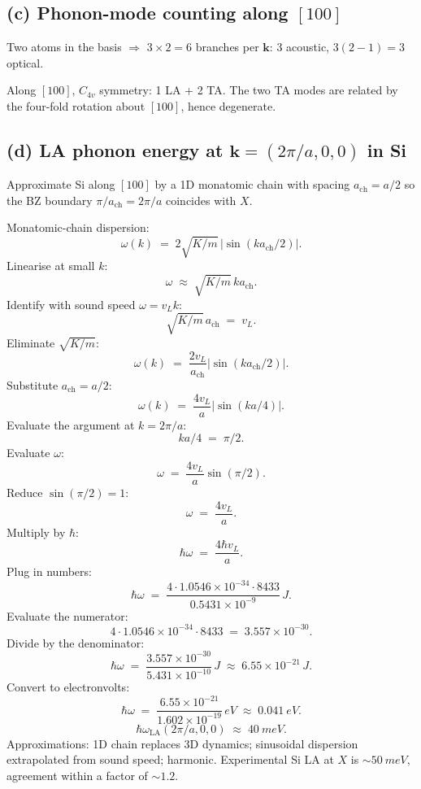 \documentclass[11pt]{article}
\begin{document}
\subsection*{(c) Phonon-mode counting along $[100]$}

Two atoms in the basis $\Rightarrow$ $3\times 2=6$ branches per $\bm k$: 3 acoustic, $3(2-1)=3$ optical.

Along $[100]$, $C_{4v}$ symmetry: 1 LA + 2 TA. The two TA modes are related by the four-fold rotation about $[100]$, hence degenerate.

\subsection*{(d) LA phonon energy at $\bm k=(2\pi/a,0,0)$ in Si}

Approximate Si along $[100]$ by a 1D monatomic chain with spacing $a_{\text{ch}}=a/2$ so the BZ boundary $\pi/a_{\text{ch}}=2\pi/a$ coincides with $X$.

Monatomic-chain dispersion:
\[
\omega(k) \;=\; 2\sqrt{K/m}\,\big|\sin(k a_{\text{ch}}/2)\big|.
\]
Linearise at small $k$:
\[
\omega \;\approx\; \sqrt{K/m}\,k a_{\text{ch}}.
\]
Identify with sound speed $\omega=v_L k$:
\[
\sqrt{K/m}\,a_{\text{ch}} \;=\; v_L.
\]
Eliminate $\sqrt{K/m}$:
\[
\omega(k) \;=\; \frac{2 v_L}{a_{\text{ch}}}\big|\sin(k a_{\text{ch}}/2)\big|.
\]
Substitute $a_{\text{ch}}=a/2$:
\[
\omega(k) \;=\; \frac{4 v_L}{a}\big|\sin(k a/4)\big|.
\]
Evaluate the argument at $k=2\pi/a$:
\[
k a/4 \;=\; \pi/2.
\]
Evaluate $\omega$:
\[
\omega \;=\; \frac{4 v_L}{a}\sin(\pi/2).
\]
Reduce $\sin(\pi/2)=1$:
\[
\omega \;=\; \frac{4 v_L}{a}.
\]
Multiply by $\hbar$:
\[
\hbar\omega \;=\; \frac{4\hbar v_L}{a}.
\]
Plug in numbers:
\[
\hbar\omega \;=\; \frac{4\cdot 1.0546\times 10^{-34}\cdot 8433}{0.5431\times 10^{-9}}\,\si{J}.
\]
Evaluate the numerator:
\[
4\cdot 1.0546\times 10^{-34}\cdot 8433 \;=\; 3.557\times 10^{-30}.
\]
Divide by the denominator:
\[
\hbar\omega \;=\; \frac{3.557\times 10^{-30}}{5.431\times 10^{-10}}\,\si{J} \;\approx\; 6.55\times 10^{-21}\,\si{J}.
\]
Convert to electronvolts:
\[
\hbar\omega \;=\; \frac{6.55\times 10^{-21}}{1.602\times 10^{-19}}\,\si{eV} \;\approx\; \SI{0.041}{eV}.
\]
\begin{equation}
\boxed{\;\hbar\omega_{\text{LA}}(2\pi/a,0,0)\;\approx\;\SI{40}{meV}.\;}
\label{eq:hwLA}
\end{equation}
Approximations: 1D chain replaces 3D dynamics; sinusoidal dispersion extrapolated from sound speed; harmonic. Experimental Si LA at $X$ is $\sim\SI{50}{meV}$, agreement within a factor of $\sim 1.2$.
\end{document}
